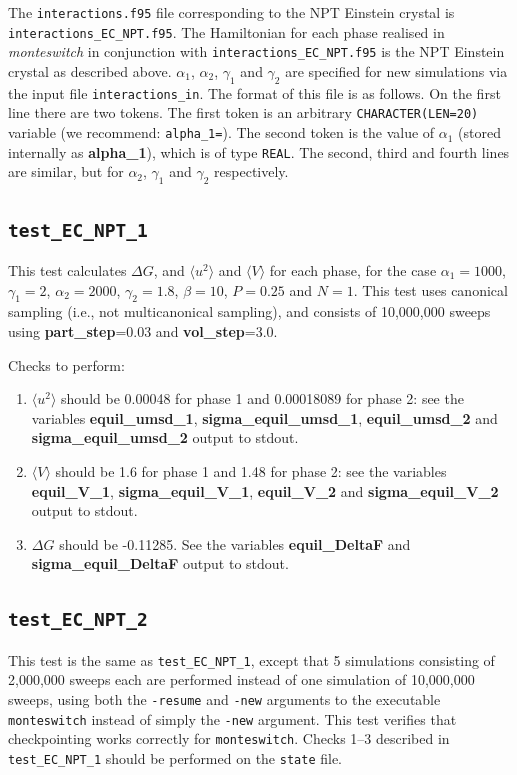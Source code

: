 \documentclass{report}
\begin{document}
The \texttt{interactions.f95} file corresponding to the NPT Einstein crystal is \texttt{interactions\_EC\_NPT.f95}. 
The Hamiltonian for each phase realised in \emph{monteswitch} in conjunction with 
\texttt{interactions\_EC\_NPT.f95} is the NPT Einstein crystal as described above.
$\alpha_1$, $\alpha_2$, $\gamma_1$ and $\gamma_2$ are specified for new simulations via the input file \texttt{interactions\_in}. 
The format of this file is as follows. On the first line there are two tokens. The first token is an arbitrary \texttt{CHARACTER(LEN=20)} 
variable (we recommend: \texttt{alpha\_1=}). The second token is the value of $\alpha_1$ (stored internally as 
\textbf{alpha\_1}), which is of type \texttt{REAL}. The second, third and fourth lines are similar, but for $\alpha_2$, $\gamma_1$ and
$\gamma_2$ respectively.


\subsection{\texttt{test\_EC\_NPT\_1}}
This test calculates $\Delta G$, and $\langle u^2\rangle$ and $\langle V\rangle$ for each phase, for the case $\alpha_1=1000$, $\gamma_1=2$,
$\alpha_2=2000$, $\gamma_2=1.8$, $\beta=10$, $P=0.25$ and $N=1$. This test uses canonical sampling (i.e., not multicanonical sampling), and 
consists of 10,000,000 sweeps using \textbf{part\_step}=0.03 and \textbf{vol\_step}=3.0.

Checks to perform:
\begin{enumerate}
\item
$\langle u^2\rangle$ should be 0.00048 for phase 1 and 0.00018089 for phase 2: see the variables 
\textbf{equil\_umsd\_1}, \textbf{sigma\_equil\_umsd\_1}, \textbf{equil\_umsd\_2} and \textbf{sigma\_equil\_umsd\_2} output to 
stdout.
\item
$\langle V\rangle$ should be 1.6 for phase 1 and 1.48 for phase 2: see the variables \textbf{equil\_V\_1}, 
\textbf{sigma\_equil\_V\_1}, \textbf{equil\_V\_2} and \textbf{sigma\_equil\_V\_2} output to stdout.
\item
$\Delta G$ should be -0.11285. See the variables \textbf{equil\_DeltaF} and \textbf{sigma\_equil\_DeltaF} output to stdout.
\end{enumerate}


\subsection{\texttt{test\_EC\_NPT\_2}}
This test is the same as \texttt{test\_EC\_NPT\_1}, except that 5 simulations consisting of 2,000,000 sweeps each are performed
instead of one simulation of 10,000,000 sweeps, using both the \texttt{-resume} and \texttt{-new} arguments to the executable 
\texttt{monteswitch} instead of simply the \texttt{-new} argument. This test verifies that checkpointing works
correctly for \texttt{monteswitch}. Checks 1--3 described in \texttt{test\_EC\_NPT\_1} should be performed on the \texttt{state} file.
\end{document}
